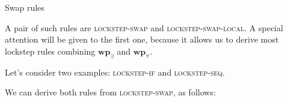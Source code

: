 \begin{mathfig}{\small}
    \begin{proofrules}        
        

        
    \end{proofrules}
    \caption{Swap rules}
\end{mathfig}

A pair of such rules are \textsc{lockstep-swap} and \textsc{lockstep-swap-local}. A special attention will be given to the first one, because it allows us to derive most lockstep rules combining $\mathbf{wp}_{\exists}$ and $\mathbf{wp}_{\forall}$.

Let's consider two examples: \textsc{lockstep-if} and \textsc{lockstep-seq}.

\resizebox{0.8\width}{!}{
\begin{proofrules}
    

    
\end{proofrules}
}

\bigskip

We can derive both rules from \textsc{lockstep-swap}, as follows:

\bigskip

\begin{prooftree}
\end{prooftree}

\bigskip

